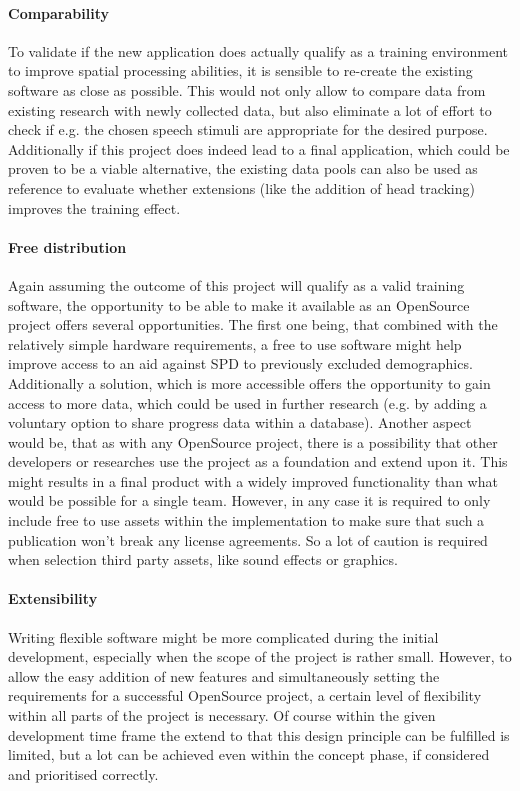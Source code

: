 \documentclass[a4paper,11pt]{article}%
\renewcommand{\\}{\vspace*{0.5\baselineskip} \newline}
\begin{document}
\paragraph{Comparability} To validate if the new application does actually qualify as a training environment to improve spatial processing abilities, it is sensible to re-create the existing software as close as possible. This would not only allow to compare data from existing research with newly collected data, but also eliminate a lot of effort to check if e.g. the chosen speech stimuli are appropriate for the desired purpose. Additionally if this project does indeed lead to a final application, which could be proven to be a viable alternative, the existing data pools can also be used as reference to evaluate whether extensions (like the addition of head tracking) improves the training effect.


\paragraph{Free distribution} Again assuming the outcome of this project will qualify as a valid training software, the opportunity to be able to make it available as an OpenSource project offers several opportunities. The first one being, that combined with the relatively simple hardware requirements, a free to use software might help improve access to an aid against \ac{SPD} to previously excluded demographics. Additionally a solution, which is more accessible offers the opportunity to gain access to more data, which could be used in further research (e.g. by adding a voluntary option to share progress data within a database). Another aspect would be, that as with any OpenSource project, there is a possibility that other developers or researches use the project as a foundation and extend upon it. This might results in a final product with a widely improved functionality than what would be possible for a single team. However, in any case it is required to only include free to use assets within the implementation to make sure that such a publication won't break any license agreements. So a lot of caution is required when selection third party assets, like sound effects or graphics.


\paragraph{Extensibility} Writing flexible software might be more complicated during the initial development, especially when the scope of the project is rather small. However, to allow the easy addition of new features and simultaneously setting the requirements for a successful OpenSource project, a certain level of flexibility within all parts of the project is necessary. Of course within the given development time frame the extend to that this design principle can be fulfilled is limited, but a lot can be achieved even within the concept phase, if considered and prioritised correctly.
\end{document}
